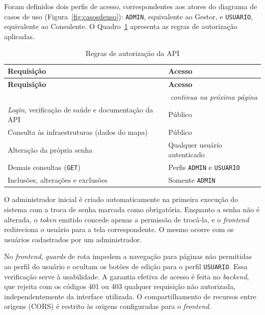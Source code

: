 Foram definidos dois perfis de acesso, correspondentes aos atores do diagrama de casos de uso (Figura~\ref{fig:casosdeuso}): \texttt{ADMIN}, equivalente ao Gestor, e \texttt{USUARIO}, equivalente ao Consulente. O Quadro~\ref{qua:permissoes} apresenta as regras de autorização aplicadas.

\begin{longtable}{p{6cm}p{7.5cm}}
\caption{Regras de autorização da API}
\label{qua:permissoes} \\
\toprule
\textbf{Requisição} & \textbf{Acesso} \\
\midrule
\endfirsthead
\toprule
\textbf{Requisição} & \textbf{Acesso} \\
\midrule
\endhead
\midrule
\multicolumn{2}{r}{\small\textit{continua na próxima página}} \\
\endfoot
\bottomrule
\endlastfoot
\textit{Login}, verificação de saúde e documentação da API & Público \\[3pt]
Consulta às infraestruturas (dados do mapa)              & Público \\[3pt]
Alteração da própria senha                                 & Qualquer usuário autenticado \\[3pt]
Demais consultas (\texttt{GET})                            & Perfis \texttt{ADMIN} e \texttt{USUARIO} \\[3pt]
Inclusões, alterações e exclusões                          & Somente \texttt{ADMIN} \\
\end{longtable}

O administrador inicial é criado automaticamente na primeira execução do sistema com a troca de senha marcada como obrigatória. Enquanto a senha não é alterada, o \textit{token} emitido concede apenas a permissão de trocá-la, e o \textit{frontend} redireciona o usuário para a tela correspondente. O mesmo ocorre com os usuários cadastrados por um administrador.

No \textit{frontend}, \textit{guards} de rota impedem a navegação para páginas não permitidas ao perfil do usuário e ocultam os botões de edição para o perfil \texttt{USUARIO}. Essa verificação serve à usabilidade. A garantia efetiva de acesso é feita no \textit{backend}, que rejeita com os códigos 401 ou 403 qualquer requisição não autorizada, independentemente da interface utilizada. O compartilhamento de recursos entre origens (CORS) é restrito às origens configuradas para o \textit{frontend}.

